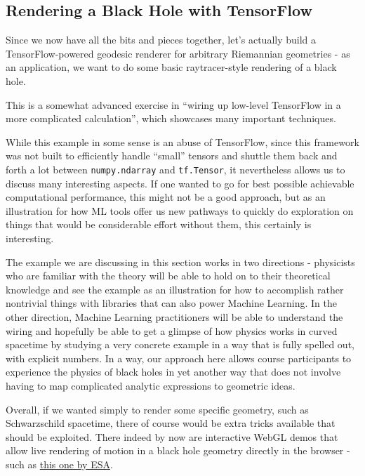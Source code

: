 \documentclass[11pt]{article}
\begin{document}
    \hypertarget{rendering-a-black-hole-with-tensorflow}{%
\subsection{Rendering a Black Hole with
TensorFlow}\label{rendering-a-black-hole-with-tensorflow}}

Since we now have all the bits and pieces together, let's actually build
a TensorFlow-powered geodesic renderer for arbitrary Riemannian
geometries - as an application, we want to do some basic raytracer-style
rendering of a black hole.

This is a somewhat advanced exercise in ``wiring up low-level TensorFlow
in a more complicated calculation'', which showcases many important
techniques.

While this example in some sense is an abuse of TensorFlow, since this
framework was not built to efficiently handle ``small'' tensors and
shuttle them back and forth a lot between \texttt{numpy.ndarray} and
\texttt{tf.Tensor}, it nevertheless allows us to discuss many
interesting aspects. If one wanted to go for best possible achievable
computational performance, this might not be a good approach, but as an
illustration for how ML tools offer us new pathways to quickly do
exploration on things that would be considerable effort without them,
this certainly is interesting.

The example we are discussing in this section works in two directions -
physicists who are familiar with the theory will be able to hold on to
their theoretical knowledge and see the example as an illustration for
how to accomplish rather nontrivial things with libraries that can also
power Machine Learning. In the other direction, Machine Learning
practitioners will be able to understand the wiring and hopefully be
able to get a glimpse of how physics works in curved spacetime by
studying a very concrete example in a way that is fully spelled out,
with explicit numbers. In a way, our approach here allows course
participants to experience the physics of black holes in yet another way
that does not involve having to map complicated analytic expressions to
geometric ideas.

Overall, if we wanted simply to render some specific geometry, such as
Schwarzschild spacetime, there of course would be extra tricks available
that should be exploited. There indeed by now are interactive WebGL
demos that allow live rendering of motion in a black hole geometry
directly in the browser - such as
\href{https://www.esa.int/gsp/ACT/phy/Projects/Blackholes/WebGL/}{this
one by ESA}.
\end{document}
